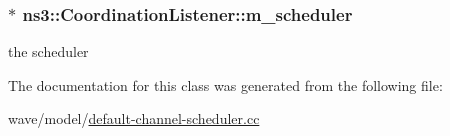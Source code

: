 \subsubsection[{\texorpdfstring{m\+\_\+scheduler}{m_scheduler}}]{$\ast$ ns3\+::\+Coordination\+Listener\+::m\+\_\+scheduler\hspace{0.3cm}{\ttfamily [private]}}\hypertarget{classns3_1_1CoordinationListener_a4fe2f8b72129c51275e086b09c3171a7}{}\label{classns3_1_1CoordinationListener_a4fe2f8b72129c51275e086b09c3171a7}


the scheduler 



The documentation for this class was generated from the following file\+:\begin{DoxyCompactItemize}
\item 
wave/model/\hyperlink{default-channel-scheduler_8cc}{default-\/channel-\/scheduler.\+cc}\end{DoxyCompactItemize}
